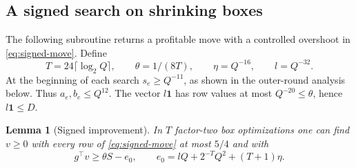 \documentclass[11pt,letterpaper]{article}
\newtheorem{lemma}[theorem]{Lemma}
\begin{document}
\subsection{A signed search on shrinking boxes}

The following subroutine returns a profitable move with a controlled overshoot in \eqref{eq:signed-move}. Define
\[
 T=24\lceil\log_2 Q\rceil,\qquad
 \theta=1/(8T),\qquad \eta=Q^{-16},\qquad l=Q^{-32}.
\]
At the beginning of each search $s_e\ge Q^{-11}$, as shown in the outer-round analysis below. Thus $a_e,b_e\le Q^{12}$. The vector $l\mathbf1$ has row values at most $Q^{-20}\le\theta$, hence $l\mathbf1\le D$.

\begin{lemma}[Signed improvement]\label{lem:signed-progress}
In $T$ factor-two box optimizations one can find $v\ge0$ with every row of \eqref{eq:signed-move} at most $5/4$ and with
\[
 g^\top v\ge\theta S-e_0,\qquad e_0=lQ+2^{-T}Q^2+(T+1)\eta .
\]
\end{lemma}
\end{document}

